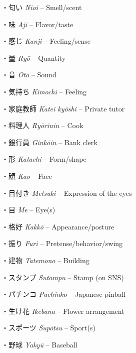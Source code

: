 \par{・匂い \emph{Nioi }– Smell\slash scent }
 
\par{・味 \emph{Aji }– Flavor\slash taste }
 
\par{・感じ \emph{Kanji }– Feeling\slash sense }
 
\par{・量 \emph{Ryō }– Quantity }
 
\par{・音 \emph{Oto }– Sound }
 
\par{・気持ち \emph{Kimochi }– Feeling }
 
\par{・家庭教師 \emph{Katei kyōshi }– Private tutor }
 
\par{・料理人 \emph{Ryōrinin }– Cook }
 
\par{・銀行員 \emph{Ginkōin }– Bank clerk }
 
\par{・形 \emph{Katachi }– Form\slash shape }
 
\par{・顔 \emph{Kao }– Face }
 
\par{・目付き \emph{Metsuki }– Expression of the eyes }
 
\par{・目 \emph{Me }– Eye(s) }
 
\par{・格好 \emph{Kakkō }– Appearance\slash posture }
 
\par{・振り \emph{Furi }– Pretense\slash behavior\slash swing }
 
\par{・建物 \emph{Tatemono }– Building }
 
\par{・スタンプ \emph{Sutampu }– Stamp (on SNS) }
 
\par{・パチンコ \emph{Pachinko }– Japanese pinball }
 
\par{・生け花 \emph{Ikebana }– Flower arrangement }
 
\par{・スポーツ \emph{Supōtsu }– Sport(s) }
 
\par{・野球 \emph{Yakyū }– Baseball }
 
